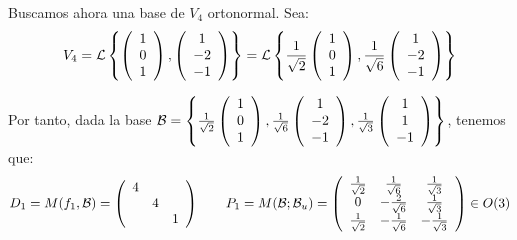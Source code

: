 \begin{ejercicio}
\begin{enumerate}
        Buscamos ahora una base de $V_4$ ortonormal. Sea:
        \begin{equation*}
            V_4 = \mathcal{L}\left\{\left(\begin{array}{c}
                1 \\ 0 \\ 1 
            \end{array}\right),
            \left(\begin{array}{c}
                1 \\ -2 \\ -1 
            \end{array}\right)\right\}
            = \mathcal{L}\left\{\frac{1}{\sqrt{2}}\left(\begin{array}{c}
                1 \\ 0 \\ 1 
            \end{array}\right),
            \frac{1}{\sqrt{6}}\left(\begin{array}{c}
                1 \\ -2 \\ -1 
            \end{array}\right)\right\}
        \end{equation*}

        Por tanto, dada la base $\mathcal{B}=\left\{\frac{1}{\sqrt{2}}\left(\begin{array}{c}
                1 \\ 0 \\ 1 
            \end{array}\right),
            \frac{1}{\sqrt{6}}\left(\begin{array}{c}
                1 \\ -2 \\ -1 
            \end{array}\right),
            \frac{1}{\sqrt{3}}\left(\begin{array}{c}
                1 \\ 1 \\ -1 
        \end{array}\right)\right\}$, tenemos que:
        \begin{equation*}
            D_1=M(f_1,\mathcal{B})=\left(\begin{array}{ccc}
                4 \\
                & 4\\
                && 1
            \end{array}\right)
            \qquad
            P_1=M(\mathcal{B};\mathcal{B}_u)=\left(\begin{array}{ccc}
                \frac{1}{\sqrt{2}} & \frac{1}{\sqrt{6}} & \frac{1}{\sqrt{3}} \\
                0 & -\frac{2}{\sqrt{6}} & \frac{1}{\sqrt{3}}\\
                \frac{1}{\sqrt{2}}& -\frac{1}{\sqrt{6}} & -\frac{1}{\sqrt{3}}
            \end{array}\right) \in O(3)
        \end{equation*}


\end{enumerate}
\end{ejercicio}
